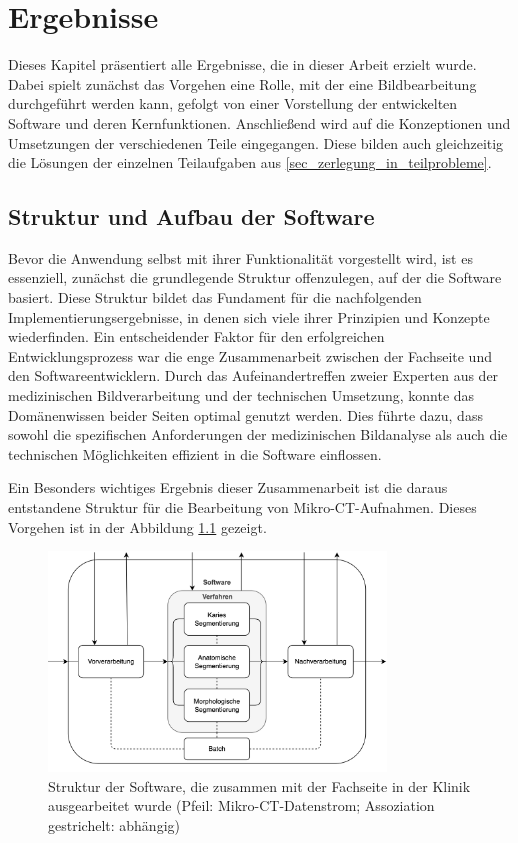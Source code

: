 \chapter{Ergebnisse}
\label{chap:ergebnisse} Dieses Kapitel präsentiert alle Ergebnisse, die in
dieser Arbeit erzielt wurde. Dabei spielt zunächst das Vorgehen eine Rolle, mit
der eine Bildbearbeitung durchgeführt werden kann, gefolgt von einer Vorstellung
der entwickelten Software und deren Kernfunktionen. Anschließend wird auf die
Konzeptionen und Umsetzungen der verschiedenen Teile eingegangen. Diese bilden auch
gleichzeitig die Lösungen der einzelnen Teilaufgaben aus \ref{sec_zerlegung_in_teilprobleme}.

\section{Struktur und Aufbau der Software}
\label{sec:struktur_der_software} Bevor die Anwendung selbst mit ihrer Funktionalität
vorgestellt wird, ist es essenziell, zunächst die grundlegende Struktur offenzulegen,
auf der die Software basiert. Diese Struktur bildet das Fundament für die nachfolgenden
Implementierungsergebnisse, in denen sich viele ihrer Prinzipien und Konzepte
wiederfinden. Ein entscheidender Faktor für den erfolgreichen Entwicklungsprozess
war die enge Zusammenarbeit zwischen der Fachseite und den Softwareentwicklern.
Durch das Aufeinandertreffen zweier Experten aus der medizinischen
Bildverarbeitung und der technischen Umsetzung, konnte das Domänenwissen beider Seiten
optimal genutzt werden. Dies führte dazu, dass sowohl die spezifischen Anforderungen
der medizinischen Bildanalyse als auch die technischen Möglichkeiten effizient in
die Software einflossen.

Ein Besonders wichtiges Ergebnis dieser Zusammenarbeit ist die daraus entstandene
Struktur für die Bearbeitung von Mikro-\ac{CT}-Aufnahmen. Dieses Vorgehen ist in
der Abbildung \ref{fig:struktur_der_software} gezeigt.

\begin{figure}[h]
	\centering
	\includegraphics[width=0.8\textwidth]{img/struktur_der_software.png}
	\caption{Struktur der Software, die zusammen mit der Fachseite in der Klinik ausgearbeitet
	wurde (Pfeil: Mikro-CT-Datenstrom; Assoziation gestrichelt: abhängig)}
	\label{fig:struktur_der_software}
\end{figure}

